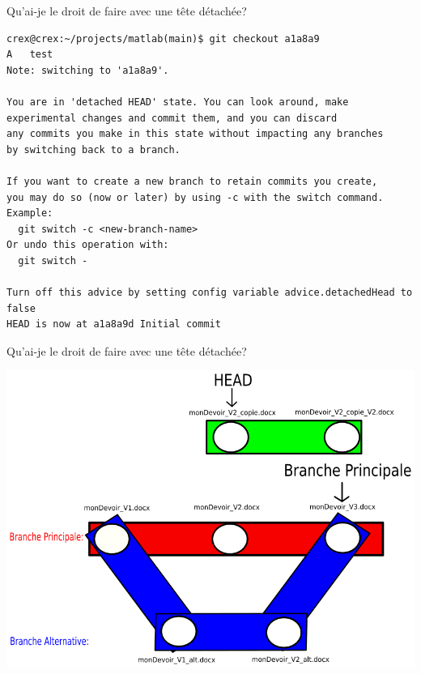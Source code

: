 \documentclass{beamer}
\begin{document}
\begin{frame}[fragile]{Qu'ai-je le droit de faire avec une tête détachée?}

\begin{mdframed}[style=Bash]
\begin{lstlisting}[style=Bash, caption={Des droits spéciaux avec une tête détachée}]
crex@crex:~/projects/matlab(main)$ git checkout a1a8a9
A	test
Note: switching to 'a1a8a9'.

You are in 'detached HEAD' state. You can look around, make 
experimental changes and commit them, and you can discard 
any commits you make in this state without impacting any branches 
by switching back to a branch.

If you want to create a new branch to retain commits you create, 
you may do so (now or later) by using -c with the switch command. 
Example:
  git switch -c <new-branch-name>
Or undo this operation with:
  git switch -

Turn off this advice by setting config variable advice.detachedHead to false
HEAD is now at a1a8a9d Initial commit
\end{lstlisting}
\end{mdframed}
\end{frame}

\begin{frame}{Qu'ai-je le droit de faire avec une tête détachée?}
    \begin{center}
        \includegraphics[scale=0.35]{images/detachedHead/detachedHead2.png}
    \end{center}
\end{frame}
\end{document}

